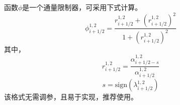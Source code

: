 函数$\phi$是一个通量限制器，可采用下式计算。
\begin{equation}
\phi_{i+1/2}^{1,2} =
\frac{r_{i+1/2}^{1,2}+(r_{i+1/2}^{1,2})^{2}}{1+(r_{i+1/2}^{1,2})^{2}}
\end{equation}
其中，
\begin{equation}
r_{i+1/2}^{1,2} =
\frac{\alpha_{i+1/2-s}^{1,2}}{\alpha_{i+1/2}^{1,2}}
\end{equation}
\begin{equation}
s = 
\mathrm{sign}
\left(
  \lambda_{i+1/2}^{1,2}
\right)
\end{equation}
该格式无需调参，且易于实现，推荐使用。




